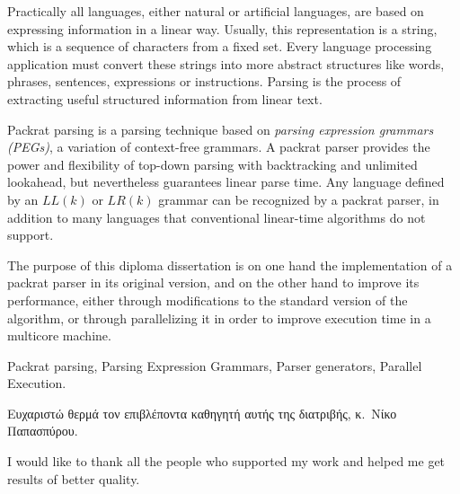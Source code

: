 \documentclass[diploma]{softlab-thesis}
\begin{document}

\begin{abstracten}%
  Practically all languages, either natural or artificial languages, are based on expressing
  information in a linear way.
  Usually, this representation is a string, which is a sequence of characters from a fixed set.
  Every language processing application must convert these strings into more abstract structures
  like words, phrases, sentences, expressions or instructions.
  Parsing is the process of extracting useful structured information from linear text.

  Packrat parsing is a parsing technique based on \emph{parsing expression grammars (PEGs)},
  a variation of context-free grammars. 
  A packrat parser provides the power and flexibility of top-down parsing with backtracking 
  and unlimited lookahead, but nevertheless guarantees linear parse time. 
  Any language defined by an $LL(k)$ or $LR(k)$ grammar can be recognized by a packrat parser, 
  in addition to many languages that conventional linear-time algorithms do not support.

  The purpose of this diploma dissertation is on one hand the implementation
  of a packrat parser in its original version, and on the other hand to improve
  its performance, either through modifications to the standard version of the algorithm,
  or through parallelizing it in order to improve execution time in a multicore machine.

  \begin{keywordsen}
	Packrat parsing,
	Parsing Expression Grammars,
	Parser generators,
	Parallel Execution.
\end{keywordsen}
\end{abstracten}



\begin{acknowledgementsgr}
  Ευχαριστώ θερμά τον επιβλέποντα καθηγητή αυτής της διατριβής,
  κ.~Νίκο Παπασπύρου.
\end{acknowledgementsgr}

\begin{acknowledgementsen}
  I would like to thank all the people who supported my work and helped me get
  results of better quality.
\end{acknowledgementsen}



\tableofcontents
\listoffigures
\end{document}

